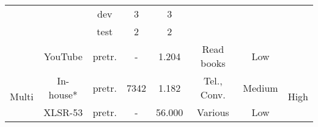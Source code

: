 \begin{table}[!h]
\begin{adjustbox}{width=0.9\columnwidth,center}
\begin{tabular}{|l|c|c|c|c|c|c|c|}
\cline{3-5}
                            &                         & dev                                                       & 3       & 3      &                                                                              &                                                           &                                                            \\ 
\cline{3-5}
                            &                         & test                                                      & 2       & 2      &                                                                              &                                                           &                                                            \\ 
\cline{2-7}
                            & YouTube                 & pretr.                                                    & -       & 1.204  & Read books                                                                   & Low                                                       &                                                            \\ 
\hline
\multirow{2}{*}{Multi}      & In-house*               & pretr.                                                    & 7342    & 1.182  & Tel., Conv.                                                                  & Medium                                                    & \multirow{2}{*}{High}                                      \\ 
\cline{2-7}
                            & XLSR-53                 & pretr.                                                    & -       & 56.000 & Various                                                                      & Low                                                       &                                                            \\
\hline
\end{tabular}
\end{adjustbox}
\caption{}
\label{table:data_stats}
\end{table}